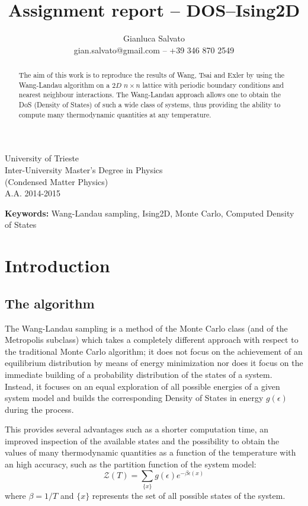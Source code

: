 \documentclass[11pt]{article}
\title{Assignment report -- DOS--Ising2D}
\author{Gianluca Salvato\\\small{gian.salvato@gmail.com -- +39 346 870 2549}}
\newenvironment{keywords}{\begin{adjustwidth}{5.2em}{5.2em}\footnotesize\textbf{Keywords:}}{\end{adjustwidth}}
\begin{document}
\VerbatimFootnotes
\DefineShortVerb{\|}

\maketitle
\begin{center}
	University of Trieste\\
	Inter-University Master’s Degree in Physics\\
	(Condensed Matter Physics)\\
	A.A. 2014-2015
\end{center}

\begin{abstract}
The aim of this work is to reproduce the results of Wang, Tsai and Exler \cite{bib:wang_landau} by using the Wang-Landau algorithm on a $2D$ $n\times n$ lattice with periodic boundary conditions and nearest neighbour interactions. The Wang-Landau approach allows one to obtain the DoS (Density of States) of such a wide class of systems, thus providing the ability to compute many thermodynamic quantities at any temperature.
\end{abstract}
\begin{keywords}
Wang-Landau sampling, Ising2D, Monte Carlo, Computed Density of States
\end{keywords}

\section{Introduction}

\subsection{The algorithm}

The Wang-Landau sampling is a method of the Monte Carlo class (and of the Metropolis subclass) which takes a completely different approach with respect to the traditional Monte Carlo algorithm; it does not focus on the achievement of an equilibrium distribution by means of energy minimization nor does it focus on the immediate building of a probability distribution of the states of a system.
Instead, it focuses on an equal exploration of all possible energies of a given system model and builds the corresponding Density of States in energy $g(\epsilon)$ during the process.

This provides several advantages such as a shorter computation time, an improved inspection of the available states and the possibility to obtain the values of many thermodynamic quantities as a function of the temperature with an high accuracy, such as the partition function of the system model:
\[
	\mathcal Z(T) = \sum_{\{x\}}g(\epsilon)e^{-\beta \epsilon(x)}
\]
where $\beta = 1/T$ and $\{x\}$ represents the set of all possible states of the system.
\end{document}

